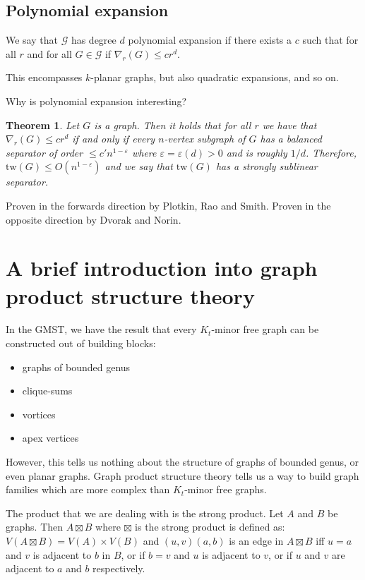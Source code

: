 \documentclass[]{article}
\newcommand{\tw}{\text{tw}}
\newtheorem{theorem}{Theorem}
\theoremstyle{definition}
\numberwithin{theorem}{section}
\numberwithin{equation}{section}
\begin{document}
\subsection{Polynomial expansion}
We say that $\mathcal{G}$ has degree $d$ polynomial expansion if there exists a $c$ such that for all $r $ and for all $G \in \mathcal{G}$ if $\nabla_r(G) \leq cr^d$. 

This encompasses $k$-planar graphs, but also quadratic expansions, and so on.

Why is polynomial expansion interesting?

\begin{theorem}
	Let $G$ is a graph. Then it holds that for all $r$ we have that $\nabla_r(G) \leq c r^d$ if and only if every $n$-vertex subgraph of $G$ has a balanced separator of order $\leq c' n^{1 - \varepsilon}$ where $\varepsilon = \varepsilon(d) > 0$ and is roughly $1/d$. Therefore, $\tw(G) \leq O(n^{1- \varepsilon})$ and we say that $\tw(G)$ has a strongly sublinear separator. 
\end{theorem}
Proven in the forwards direction by Plotkin, Rao and Smith.
Proven in the opposite direction by Dvorak and Norin. 

\section{A brief introduction into graph product structure theory}

In the GMST, we have the result that every $K_t$-minor free graph can be constructed out of building blocks:
\begin{itemize}
	\item graphs of bounded genus
	\item clique-sums
	\item vortices
	\item apex vertices
\end{itemize}
However, this tells us nothing about the structure of graphs of bounded genus, or even planar graphs. Graph product structure theory tells us a way to build graph families which are more complex than $K_t$-minor free graphs. 

The product that we are dealing with is the strong product. Let $A$ and $B$ be graphs. Then $A \boxtimes B$ where $\boxtimes$ is the strong product is defined as:
$V(A \boxtimes B) = V(A) \times V(B)$
and $(u,v)(a,b)$ is an edge in $A \boxtimes B$ iff $u = a$ and $ v$ is adjacent to $b$ in $B$, or if $b = v$ and $u $ is adjacent to $v$, or if $u$ and $v$ are adjacent to $a$ and $b$ respectively. 
\end{document}
